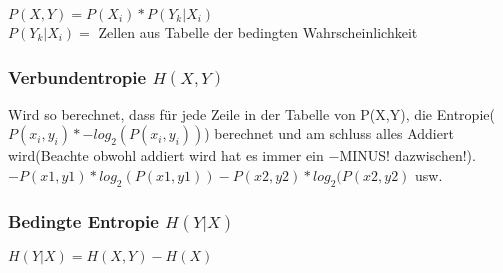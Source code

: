 \colorbox{lightlightgrey}{$P(X,Y) = P(X_i) * P(Y_k | X_i)$}\\
$P(Y_k | X_i) = $ Zellen aus Tabelle der bedingten Wahrscheinlichkeit


\subsubsection{Verbundentropie $H(X,Y)$}
Wird so berechnet, dass für jede Zeile in der Tabelle von P(X,Y), die Entropie(\colorbox{lightlightgrey}{$P(x_i,y_i)*-log_2(P(x_i, y_i))$}) berechnet und am schluss alles Addiert wird(Beachte obwohl addiert wird hat es immer ein $-$MINUS! dazwischen!).\\
\colorbox{lightlightgrey}{$-P(x1,y1) * log_2(P(x1,y1)) - P(x2,y2) * log_2(P(x2,y2)$ usw.}
\subsubsection{Bedingte Entropie $H(Y|X)$}
\colorbox{lightlightgrey}{$H(Y|X) = H(X,Y) - H(X)$}











\vfill
$$
